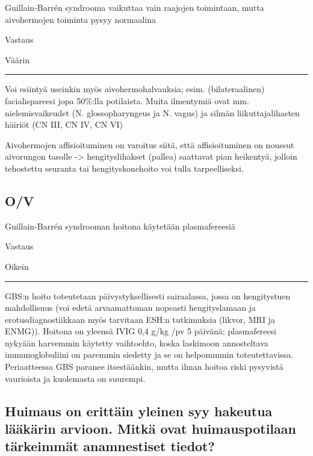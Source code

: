 \documentclass[
]{book}
\begin{document}
Guillain-Barrén syndrooma vaikuttaa vain raajojen toimintaan, mutta aivohermojen toiminta pysyy normaalina

Vastaus

Väärin

\begin{center}\rule{0.5\linewidth}{0.5pt}\end{center}

Voi esiintyä useinkin myös aivohermohalvauksia; esim. (bilateraalinen) facialispareesi jopa 50\%:lla potilaista. Muita ilmentymiä ovat mm. nielemisvaikeudet (N. glossopharyngeus ja N. vagus) ja silmän liikuttajalihasten häiriöt (CN III, CN IV, CN VI)

Aivohermojen affisioituminen on varoitus siitä, että affisioituminen on noussut aivorungon tasolle -\textgreater{} hengityslihakset (pallea) saattavat pian heikentyä, jolloin tehostettu seuranta tai hengityskonehoito voi tulla tarpeelliseksi.

\subsection{O/V}\label{ov-21}

Guillain-Barrén syndrooman hoitona käytetään plasmafereesiä

Vastaus

Oikein

\begin{center}\rule{0.5\linewidth}{0.5pt}\end{center}

GBS:n hoito toteutetaan päivystyksellisesti sairaalassa, jossa on hengitystuen mahdollisuus (voi edetä arvaamattoman nopeasti hengityslamaan ja erotusdiagnostiikkaan myös tarvitaan ESH:n tutkimuksia (likvor, MRI ja ENMG)). Hoitona on yleensä IVIG 0,4 g/kg /pv 5 päivänä; plasmafereesi nykyään harvemmin käytetty vaihtoehto, koska laskimoon annosteltava immunoglobuliini on paremmin siedetty ja se on helpommmin toteutettavissa. Periaatteessa GBS paranee itsestäänkin, mutta ilman hoitoa riski pysyvistä vaurioista ja kuolemasta on suurempi.

\subsection{Huimaus on erittäin yleinen syy hakeutua lääkärin arvioon. Mitkä ovat huimauspotilaan tärkeimmät anamnestiset tiedot?}\label{huimaus-on-erittuxe4in-yleinen-syy-hakeutua-luxe4uxe4kuxe4rin-arvioon.-mitkuxe4-ovat-huimauspotilaan-tuxe4rkeimmuxe4t-anamnestiset-tiedot}
\end{document}

